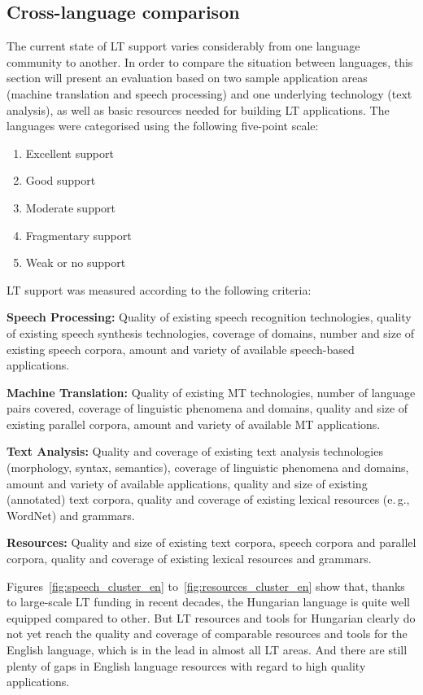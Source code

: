 \begin{multicols}{2}
\subsection{Cross-language comparison}

The current state of LT support varies considerably from one language community to another. In order to compare the situation between languages, this section will present an evaluation based on two sample application areas (machine translation and speech processing) and one underlying technology (text analysis), as well as basic resources needed for building LT applications. The languages were categorised using the following five-point scale: 

\begin{enumerate}
\item Excellent support
\item Good support
\item Moderate support
\item Fragmentary support
\item Weak or no support
\end{enumerate}

LT support was measured according to the following criteria:

\textbf{Speech Processing:} Quality of existing speech recognition technologies, quality of existing speech synthesis technologies, coverage of domains, number and size of existing speech corpora, amount and variety of available speech-based applications.

\textbf{Machine Translation:} Quality of existing MT technologies, number of language pairs covered, coverage of linguistic phenomena and domains, quality and size of existing parallel corpora, amount and variety of available MT applications.

\textbf{Text Analysis:} Quality and coverage of existing text analysis technologies (morphology, syntax, semantics), coverage of linguistic phenomena and domains, amount and variety of available applications, quality and size of existing (annotated) text corpora, quality and coverage of existing lexical resources (e.\,g., WordNet) and grammars.

\textbf{Resources:} Quality and size of existing text corpora, speech corpora and parallel corpora, quality and coverage of existing lexical resources and grammars.

Figures~\ref{fig:speech_cluster_en} to~\ref{fig:resources_cluster_en} show that, thanks to large-scale LT funding in recent decades, the Hungarian language is quite well equipped compared to other. But LT resources and tools for Hungarian clearly do not yet reach the quality and coverage of comparable resources and tools for the English language, which is in the lead in almost all LT areas. And there are still plenty of gaps in English language resources with regard to high quality applications.


\end{multicols}
